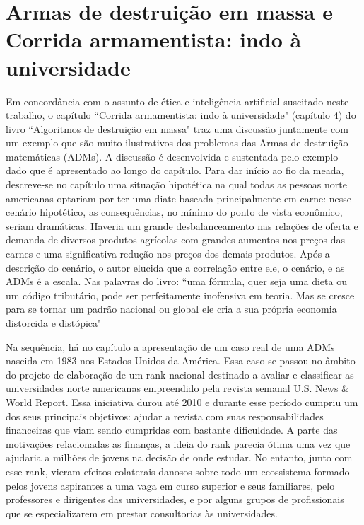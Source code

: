 \documentclass{article}
\begin{document}
\section*{Armas de destruição em massa e Corrida armamentista: indo à universidade}
Em concordância com o assunto de ética e inteligência artificial suscitado neste trabalho, o capítulo ``Corrida armamentista: indo à universidade" (capítulo 4) do livro ``Algoritmos de destruição em massa" \cite{o2021algoritmos} traz uma discussão juntamente com um exemplo que são muito ilustrativos dos problemas das Armas de destruição matemáticas (ADMs). A discussão é desenvolvida e sustentada pelo exemplo dado que é apresentado ao longo do capítulo. Para dar início ao fio da meada, descreve-se no capítulo uma situação hipotética na qual todas as pessoas norte americanas optariam por ter uma diate baseada principalmente em carne: nesse cenário hipotético, as consequências, no mínimo do ponto de vista econômico, seriam dramáticas. Haveria um grande desbalanceamento nas relações de oferta e demanda de diversos produtos agrícolas com grandes aumentos nos preços das carnes e uma significativa redução nos preços dos demais produtos. Após a descrição do cenário, o autor elucida que a correlação entre ele, o cenário, e as ADMs é a escala. Nas palavras do livro: ``uma fórmula, quer seja uma dieta ou um código tributário, pode ser perfeitamente inofensiva em teoria. Mas se cresce para se tornar um padrão nacional ou global ele cria a sua própria economia distorcida e distópica"

Na sequência, há no capítulo a apresentação de um caso real de uma ADMs nascida em 1983 nos Estados Unidos da América. Essa caso se passou no âmbito do projeto de elaboração de um rank nacional destinado a avaliar e classificar as universidades norte americanas empreendido pela revista semanal U.S. News \& World Report. Essa iniciativa durou até 2010 e durante esse período cumpriu um dos seus principais objetivos: ajudar a revista com suas responsabilidades financeiras que viam sendo cumpridas com bastante dificuldade. A parte das motivações relacionadas as finanças, a ideia do rank parecia ótima uma vez que ajudaria a milhões de jovens na decisão de onde estudar. No entanto, junto com esse rank, vieram efeitos colaterais danosos sobre todo um ecossistema formado pelos jovens aspirantes a uma vaga em curso superior e seus familiares, pelo professores e dirigentes das universidades, e por alguns grupos de profissionais que se especializarem em prestar consultorias às universidades. 
\end{document}
